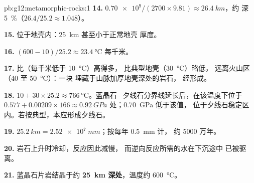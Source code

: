 \begin{solution}{pb:g12:metamorphic-rocks:1}
\textbf{14.} $\num{0.70e9}/(2700 \times 9.81) \approx \qty{26.4}{km}$，约
深 \qty{5}{\percent}（$26.4/25.2 \approx 1.048$）。

\textbf{15.} 位于地壳内：\qty{25}{km} 甚至小于正常地壳
厚度。

\textbf{16.} $(600 - 10)/25.2 \approx \qty{23.4}{\celsius}$ 每千米。

\textbf{17.} 比（每千米低于 \qty{10}{\celsius}）高得多，
比典型地壳（\qty{30}{\celsius}）略低，
远离火山区（40 至 \qty{50}{\celsius}）：一块
埋藏于山脉加厚地壳深处的岩石，
经形成。

\textbf{18.} $10 + 30 \times 25.2 \approx \qty{766}{\celsius}$。蓝晶石--
夕线石分界线延长后，在该温度下位于 $0.577 + 0.00209 \times 166
\approx \qty{0.92}{GPa}$ 处；\qty{0.70}{GPa} 低于该值，
位于夕线石稳定区内。若按典型，本应形成夕线石。

\textbf{19.} $\qty{25.2}{km} = \qty{2.52e7}{mm}$；按每年 \qty{0.5}{mm} 计，
约 5000 万年。

\textbf{20.} 岩石上升时冷却，反应因此减慢，
而逆向反应所需的水在下沉途中
已被驱离。

\textbf{21.} 蓝晶石片岩结晶于约 \textbf{\qty{25}{km}
深处}，温度约 \qty{600}{\celsius}。
\end{solution}
